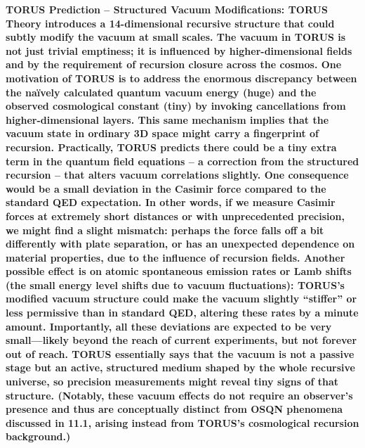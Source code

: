 \documentclass[]{article}
\begin{document}
\textbf{TORUS Prediction -- Structured Vacuum Modifications: TORUS
Theory introduces a 14-dimensional recursive structure that could subtly
modify the vacuum at small scales. The vacuum in TORUS is not just
trivial emptiness; it is influenced by higher-dimensional fields and by
the requirement of recursion closure across the cosmos. One motivation
of TORUS is to address the enormous discrepancy between the naïvely
calculated quantum vacuum energy (huge) and the observed cosmological
constant (tiny) by invoking cancellations from higher-dimensional
layers. This same mechanism implies that the vacuum state in ordinary 3D
space might carry a fingerprint of recursion. Practically, TORUS
predicts there could be a tiny extra term in the quantum field equations
-- a correction from the structured recursion -- that alters vacuum
correlations slightly. One consequence would be a small deviation in the
Casimir force compared to the standard QED expectation. In other words,
if we measure Casimir forces at extremely short distances or with
unprecedented precision, we might find a slight mismatch: perhaps the
force falls off a bit differently with plate separation, or has an
unexpected dependence on material properties, due to the influence of
recursion fields. Another possible effect is on atomic spontaneous
emission rates or Lamb shifts (the small energy level shifts due to
vacuum fluctuations): TORUS's modified vacuum structure could make the
vacuum slightly ``stiffer'' or less permissive than in standard QED,
altering these rates by a minute amount. Importantly, all these
deviations are expected to be very small---likely beyond the reach of
current experiments, but not forever out of reach. TORUS essentially
says that the vacuum is not a passive stage but an active, structured
medium shaped by the whole recursive universe, so precision measurements
might reveal tiny signs of that structure. (Notably, these vacuum
effects do not require an observer's presence and thus are conceptually
distinct from OSQN phenomena discussed in 11.1, arising instead from
TORUS's cosmological recursion background.)}
\end{document}
